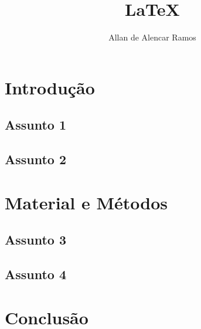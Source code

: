\documentclass[12pt, a4paper, oneside]{book}
\begin{document}
\title{LaTeX}
\author{Allan de Alencar Ramos}
\maketitle

\tableofcontents
\newpage

\chapter{Introdução}

\section{Assunto 1}

\section{Assunto 2}

\chapter{Material e Métodos}

\section{Assunto 3}

\section{Assunto 4}

\chapter{Conclusão}
\end{document}
